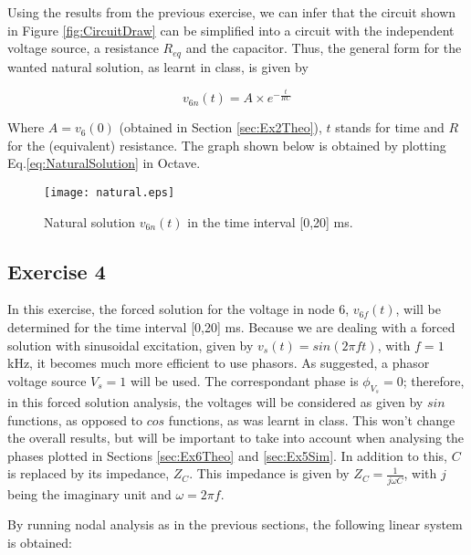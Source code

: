 Using the results from the previous exercise, we can infer that the circuit shown in Figure \ref{fig:CircuitDraw} can be simplified into a circuit with the independent voltage source, a resistance $R_{eq}$ and the capacitor. Thus, the general form for the wanted natural solution, as learnt in class, is given by

\begin{equation} \label{eq:NaturalSolution}
  v_{6n}(t)=A \times e^{-\frac{t}{RC}}
\end{equation}

Where $A=v_6(0)$ (obtained in Section \ref{sec:Ex2Theo}), $t$ stands for time and $R$ for the (equivalent) resistance. The graph shown below is obtained by plotting Eq.\ref{eq:NaturalSolution} in Octave.

\begin{figure}[H]
  \centering
  \texttt{[image: natural.eps]}
  \caption{Natural solution $v_{6n}(t)$ in the time interval [0,20] ms.}
  \label{fig:NaturalSolutionGraph}
\end{figure}


\subsection{Exercise 4} \label{sec:Ex4Theo}

In this exercise, the forced solution for the voltage in node 6, $v_{6f}(t)$, will be determined for the time interval [0,20] ms. Because we are dealing with a forced solution with sinusoidal excitation, given by $v_s(t)=sin(2\pi ft)$, with $f=1$kHz, it becomes much more efficient to use phasors. As suggested, a phasor voltage source $V_s=1$ will be used. The correspondant phase is $\phi_{V_s}=0$; therefore, in this forced solution analysis, the voltages will be considered as given by $sin$ functions, as opposed to $cos$ functions, as was learnt in class. This won't change the overall results, but will be important to take into account when analysing the phases plotted in Sections \ref{sec:Ex6Theo} and \ref{sec:Ex5Sim}. In addition to this, $C$ is replaced by its impedance, $Z_C$. This impedance is given by $Z_C=\frac{1}{j\omega C}$, with $j$ being the imaginary unit and $\omega=2\pi f$.
\par
By running nodal analysis as in the previous sections, the following linear system is obtained: 

